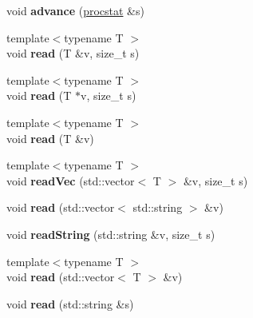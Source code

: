\begin{DoxyCompactItemize}
void {\bfseries advance} (\hyperlink{classfaster_1_1procstat}{procstat} \&s)
\item 
\hypertarget{classfaster_1_1fastCommBuffer_add86f6104e056f605ac080438ddf58f4}{}\label{classfaster_1_1fastCommBuffer_add86f6104e056f605ac080438ddf58f4} 
{\footnotesize template$<$typename T $>$ }\\void {\bfseries read} (T \&v, size\+\_\+t s)
\item 
\hypertarget{classfaster_1_1fastCommBuffer_aad2acb51374cc1fac0bc46ee6810bc50}{}\label{classfaster_1_1fastCommBuffer_aad2acb51374cc1fac0bc46ee6810bc50} 
{\footnotesize template$<$typename T $>$ }\\void {\bfseries read} (T $\ast$v, size\+\_\+t s)
\item 
\hypertarget{classfaster_1_1fastCommBuffer_a69122ec66b22498052126f359c5bd6f4}{}\label{classfaster_1_1fastCommBuffer_a69122ec66b22498052126f359c5bd6f4} 
{\footnotesize template$<$typename T $>$ }\\void {\bfseries read} (T \&v)
\item 
\hypertarget{classfaster_1_1fastCommBuffer_a216070c6f8d5070154a50f40b7896add}{}\label{classfaster_1_1fastCommBuffer_a216070c6f8d5070154a50f40b7896add} 
{\footnotesize template$<$typename T $>$ }\\void {\bfseries read\+Vec} (std\+::vector$<$ T $>$ \&v, size\+\_\+t s)
\item 
\hypertarget{classfaster_1_1fastCommBuffer_a757962624ac8bcc0d6a880ccb7bb03db}{}\label{classfaster_1_1fastCommBuffer_a757962624ac8bcc0d6a880ccb7bb03db} 
void {\bfseries read} (std\+::vector$<$ std\+::string $>$ \&v)
\item 
\hypertarget{classfaster_1_1fastCommBuffer_a41bb4e65b2fb070761be378ce2b3601a}{}\label{classfaster_1_1fastCommBuffer_a41bb4e65b2fb070761be378ce2b3601a} 
void {\bfseries read\+String} (std\+::string \&v, size\+\_\+t s)
\item 
\hypertarget{classfaster_1_1fastCommBuffer_a95cf508e01224680a336c5f20e24ae4a}{}\label{classfaster_1_1fastCommBuffer_a95cf508e01224680a336c5f20e24ae4a} 
{\footnotesize template$<$typename T $>$ }\\void {\bfseries read} (std\+::vector$<$ T $>$ \&v)
\item 
\hypertarget{classfaster_1_1fastCommBuffer_aacf66de0fb075c3a588d86a266c7bb8e}{}\label{classfaster_1_1fastCommBuffer_aacf66de0fb075c3a588d86a266c7bb8e} 
void {\bfseries read} (std\+::string \&s)
\item 
\hypertarget{classfaster_1_1fastCommBuffer_aa53c0eac8725e8a0ea773bd027b7be32}{}\label{classfaster_1_1fastCommBuffer_aa53c0eac8725e8a0ea773bd027b7be32} 

\end{DoxyCompactItemize}
